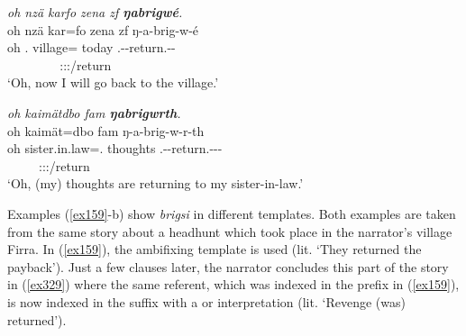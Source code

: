 \begin{exe}
	\ex \emph{oh nzä karfo zena zf \textbf{ŋabrigwé}.}\\
	\glll oh nzä kar=fo zena zf ŋ-a-brig-w-é\\
	oh \Fsg.{\Abs} village={\All} today {\Imm} \M.\Alph-\Vc-return.\Ext-\Ndu-\Fsg\\
	~ ~ ~ ~ ~ {\footnotesize \Fsg:\Sbj:\Nonpast:\Ipfv/return}\\
	\trans `Oh, now I will go back to the village.' 
	\label{ex161}
\end{exe}
\begin{exe}
	\ex \emph{oh kaimätdbo fam \textbf{ŋabrigwrth}.}\\
	\glll oh kaimät=dbo fam ŋ-a-brig-w-r-th\\
	oh sister.in.law=\All.\Anim{} thoughts \M.\Alph-\Vc-return.\Ext-\Ndu-\Lk-\Stnsg\\
	~ ~ ~ {\footnotesize \Stpl:\Sbj:\Nonpast:\Ipfv/return}\\
	\trans `Oh, (my) thoughts are returning to my sister-in-law.' 
	\label{ex162}
\end{exe}

Examples (\ref{ex159}-b) show \emph{brigsi} in different templates. Both examples are taken from the same story about a headhunt which took place in the narrator's village Firra. In (\ref{ex159}), the ambifixing  template is used (lit. `They returned the payback'). Just a few clauses later, the narrator concludes this part of the story in (\ref{ex329}) where the same referent, which was indexed in the prefix in (\ref{ex159}), is now indexed in the suffix with a  or  interpretation (lit. `Revenge (was) returned').

